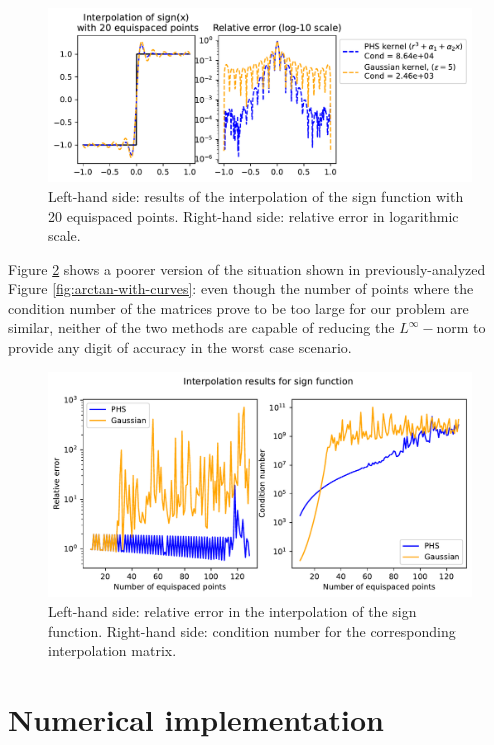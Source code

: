 \documentclass[12pt]{report} %
\begin{document}
\begin{figure}[ht]
  \centering
  \includegraphics[width=\textwidth]{imagenes/experiments/1d/intro/sign-with-20-pts.pdf}
  \caption{Left-hand side: results of the interpolation of the sign function with 20 equispaced points. Right-hand side: relative error in logarithmic scale.}
  \label{fig:sign-with-20-pts}
\end{figure}

Figure \ref{fig:sign-with-curves} shows a poorer version of the situation shown in previously-analyzed Figure \ref{fig:arctan-with-curves}: even though the number of points where the condition number of the matrices prove to be too large for our problem are similar, neither of the two methods are capable of reducing the $L^\infty-$norm to provide any digit of accuracy in the worst case scenario.

\begin{figure}[ht]
  \centering
  \includegraphics[width=.8\textwidth]{imagenes/experiments/1d/intro/sign-interpolation-curves.pdf}
  \caption{Left-hand side: relative error in the interpolation of the sign function. Right-hand side: condition number for the corresponding interpolation matrix.}
  \label{fig:sign-with-curves}
\end{figure}



\chapter{Numerical implementation}
\label{chap:preliminary-experimentation}
\end{document}
